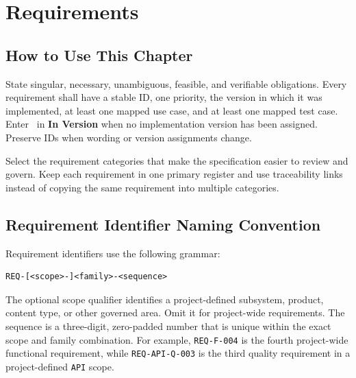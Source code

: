 \chapter{Requirements}

\section{How to Use This Chapter}
State singular, necessary, unambiguous, feasible, and verifiable obligations.
Every requirement shall have a stable ID, one priority, the version in which it
was implemented, at least one mapped use case, and at least one mapped test case.
Enter \NoVersion\ in \textbf{In Version} when no implementation version has
been assigned. Preserve IDs when wording or version assignments change.

Select the requirement categories that make the specification easier to review
and govern. Keep each requirement in one primary register and use traceability
links instead of copying the same requirement into multiple categories.

\section{Requirement Identifier Naming Convention}
\label{Section:RequirementIdentifierConvention}

Requirement identifiers use the following grammar:
\begin{verbatim}
REQ-[<scope>-]<family>-<sequence>
\end{verbatim}
The optional scope qualifier identifies a project-defined subsystem, product,
content type, or other governed area. Omit it for project-wide requirements.
The sequence is a three-digit, zero-padded number that is unique within the
exact scope and family combination. For example, \texttt{REQ-F-004} is the
fourth project-wide functional requirement, while
\texttt{REQ-API-Q-003} is the third quality requirement in a project-defined
\texttt{API} scope.

